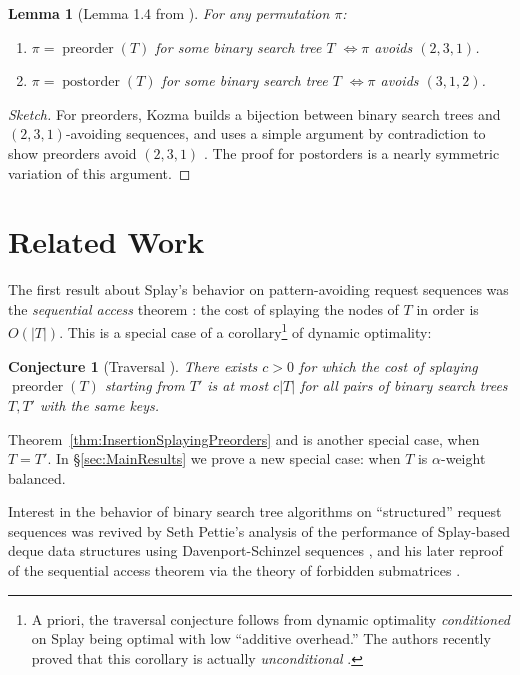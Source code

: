 \documentclass{article}
\theoremstyle{plain}
\newtheorem{lemma}{Lemma}
\newtheorem{conjecture}{Conjecture}
\theoremstyle{definition}
\newenvironment{thmenum}
 {\begin{enumerate}[label=\upshape(\alph*),ref=\thetheorem(\alph*)]}
 {\end{enumerate}}
\DeclareMathOperator{\Postorder}{postorder}
\DeclareMathOperator{\Preorder}{preorder}
\begin{document}
%
\begin{lemma}[Lemma 1.4 from \cite{KOZMA_THESIS}] For any permutation $\pi$: \item
\begin{thmenum}
\item\label{lem:Preorders231} $\pi=\Preorder(T)$ for some binary search tree $T$ $\iff\pi$ avoids $(2,3,1)$.
\item\label{lem:Postorders312} $\pi=\Postorder(T)$ for some binary search tree $T$ $\iff\pi$ avoids $(3,1,2)$.
\end{thmenum}
\end{lemma}
%
\begin{proof}[Sketch]
For preorders, Kozma builds a bijection between binary search trees and
$(2,3,1)$-avoiding sequences, and uses a simple argument by contradiction to
show preorders avoid $(2,3,1)$ \cite{KOZMA_THESIS}. The proof for postorders is
a nearly symmetric variation of this argument.
\end{proof}

\section{Related Work}\label{sec:RelatedWork}

%
The first result about Splay's behavior on pattern-avoiding request sequences
was the \emph{sequential access} theorem \cite{SEQUENTIAL_ACCESS}: the cost of
splaying the nodes of $T$ in order is $O(|T|)$. This is a special case of a
corollary\footnote{A priori, the traversal conjecture follows from dynamic
optimality \emph{conditioned} on Splay being optimal with low ``additive
overhead.'' The authors recently proved that this corollary is actually
\emph{unconditional} \cite{A_NEW_PATH}.} of dynamic optimality:
%
\begin{conjecture}[Traversal \cite{SPLAY_JOURNAL}]
There exists $c>0$ for which the cost of splaying $\Preorder(T)$ starting from
$T'$ is at most $c|T|$ for all pairs of binary search trees $T, T'$ with the
same keys.
\end{conjecture}
%
Theorem~\ref{thm:InsertionSplayingPreorders} and \cite{SPLAY_PREORDER} is
another special case, when $T=T'$. In \S\ref{sec:MainResults} we prove a new
special case: when $T$ is $\alpha$-weight balanced.

%
Interest in the behavior of binary search tree algorithms on ``structured''
request sequences was revived by Seth Pettie's analysis of the performance of
Splay-based deque data structures using Davenport-Schinzel sequences
\cite{DAVENPORT_SCHINZEL}, and his later reproof of the sequential access
theorem via the theory of forbidden submatrices \cite{FORBIDDEN_SUBMATRIX}.
\end{document}
